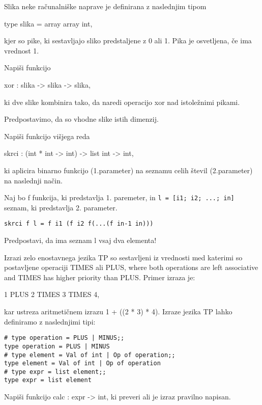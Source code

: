 \begin{ex}
  Slika neke ra\v cunalni\v ske naprave je definirana z naslednjim
  tipom

  type slika = array array int,

  kjer so pike, ki sestavljajo sliko predstaljene z 0 ali 1. Pika je
  osvetljena, \v ce ima vrednost 1.

  Napi\v si funkcijo

  xor : slika -> slika -> slika,

  ki dve slike kombinira tako, da naredi operacijo xor nad istole\v
  znimi pikami.

  Predpostavimo, da so vhodne slike istih dimenzij.


\end{ex} 
\begin{ex} 
  Napi\v si funkcijo vi\v sjega reda

  skrci : (int * int -> int) -> list int -> int,

  ki aplicira binarno funkcijo (1.parameter) na seznamu celih \v
  stevil (2.parameter) na naslednji na\v cin.

  Naj bo f funkcija, ki predstavlja 1. paremeter, in \texttt{l = [i1;
    i2; ...; in] } seznam, ki predstavlja 2. parameter.

\begin{verbatim}
skrci f l = f i1 (f i2 f(...(f in-1 in)))
\end{verbatim}

  Predpostavi, da ima seznam l vsaj dva elementa!


\end{ex}
 \begin{ex}
   Izrazi zelo enostavnega jezika TP so sestavljeni iz vrednosti med
   katerimi so postavljene operaciji TIMES ali PLUS, where both
   operations are left associative and TIMES has higher priority than
   PLUS. Primer izraza je:

   1 PLUS 2 TIMES 3 TIMES 4,

   kar ustreza aritmeti\v cnem izrazu 1 + ((2 * 3) * 4). Izraze jezika
   TP lahko definiramo z naslednjimi tipi:
 
\begin{verbatim}
# type operation = PLUS | MINUS;; 
type operation = PLUS | MINUS 
# type element = Val of int | Op of operation;; 
type element = Val of int | Op of operation
# type expr = list element;;
type expr = list element
\end{verbatim}

   Napi\v si funkcijo calc : expr -> int, ki preveri ali je izraz
   pravilno napisan.



\end{ex}
